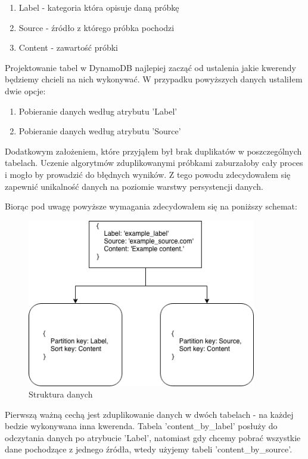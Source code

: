 \begin{enumerate}
    \item Label - kategoria która opisuje daną próbkę
    
    \item Source - źródło z którego próbka pochodzi
    
    \item Content - zawartość próbki
\end{enumerate}

Projektowanie tabel w DynamoDB najlepiej zacząć od ustalenia jakie kwerendy będziemy chcieli na nich wykonywać. W przypadku powyższych danych ustaliłem dwie opcje:

\begin{enumerate}
    \item Pobieranie danych według atrybutu 'Label'
    
    \item Pobieranie danych według atrybutu 'Source'
\end{enumerate}

Dodatkowym założeniem, które przyjąłem był brak duplikatów w poszczególnych tabelach. Uczenie algorytmów zduplikowanymi próbkami zaburzałoby cały proces i mogło by prowadzić do błędnych wyników. Z tego powodu zdecydowałem się zapewnić unikalność danych na poziomie warstwy persystencji danych.

Biorąc pod uwagę powyższe wymagania zdecydowałem się na poniższy schemat:

\begin{figure}[H]
    \centering
    \includegraphics[width=10cm]{data_structure.png}
    \caption{Struktura danych}
\end{figure}

Pierwszą ważną cechą jest zduplikowanie danych w dwóch tabelach - na każdej bedzie wykonywana inna kwerenda. Tabela 'content\_by\_label' posłuży do odczytania danych po atrybucie 'Label', natomiast gdy chcemy pobrać wszystkie dane pochodzące z jednego źródła, wtedy użyjemy tabeli 'content\_by\_source'.

